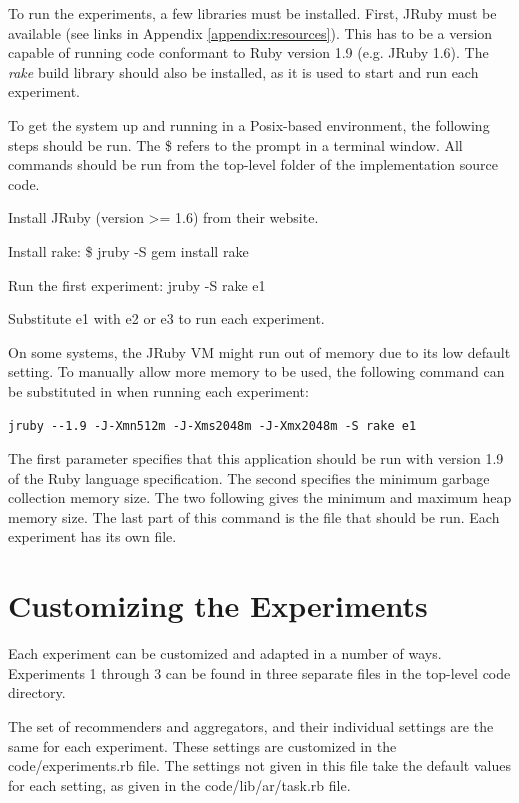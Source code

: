 To run the experiments, a few libraries must be installed. 
First, JRuby must be available (see links in Appendix \ref{appendix:resources}).
This has to be a version capable of running code conformant to Ruby version 1.9 (e.g. JRuby 1.6).
The \emph{rake} build library should also be installed, as it is used to start and run each experiment.

To get the system up and running in a Posix-based environment, 
the following steps should be run.
The \textsf{\$} refers to the prompt in a terminal window.
All commands should be run from the top-level folder of the implementation source code.

\begin{enumerate*}
  \item Install JRuby (version >= 1.6) from their website.
  \item Install rake: \textsf{\$ jruby -S gem install rake}
  \item Run the first experiment: \textsf{jruby -S rake e1}
  \item Substitute \textsf{e1} with \textsf{e2} or \textsf{e3} to run each experiment.
\end{enumerate*}

On some systems, the JRuby VM might run out of memory due to its low default setting.
To manually allow more memory to be used, the following command
can be substituted in when running each experiment:

{
\footnotesize
\begin{verbatim}
jruby --1.9 -J-Xmn512m -J-Xms2048m -J-Xmx2048m -S rake e1
\end{verbatim}
}

The first parameter specifies that this application should be run with version 1.9 of the Ruby language specification.
The second specifies the minimum garbage collection memory size.
The two following gives the minimum and maximum heap memory size.
The last part of this command is the file that should be run.
Each experiment has its own file.


\section{Customizing the Experiments}

Each experiment can be customized and adapted in a number of ways.
Experiments 1 through 3 can be found in three separate files
in the top-level code directory.

The set of recommenders and aggregators, and their individual settings
are the same for each experiment. 
These settings are customized in the \textsf{code/experiments.rb} file.
The settings not given in this file take the default values for each setting,
as given in the \textsf{code/lib/ar/task.rb} file.

